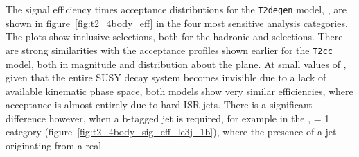 The signal efficiency times acceptance distributions for the \texttt{T2degen} model,
\Ttwodegen, are shown 
in figure~\ref{fig:t2_4body_eff} in the four most sensitive analysis categories.
The plots show inclusive \HT selections, both for the hadronic and \mj
selections. There
are strong similarities with the acceptance profiles shown earlier for the
\texttt {T2cc} model,
both in magnitude and distribution about the plane. At small values of \deltam, 
given that the entire SUSY decay system becomes invisible due to a lack of 
available kinematic phase space, both models show very similar efficiencies,
where
acceptance is almost entirely due to hard ISR jets. There is a
significant difference however, when a b-tagged jet is required, for example in 
the \njlow, \nb= 1 category (figure~\ref{fig:t2_4body_sig_eff_le3j_1b}), where
the presence of a jet originating from a real 
%
